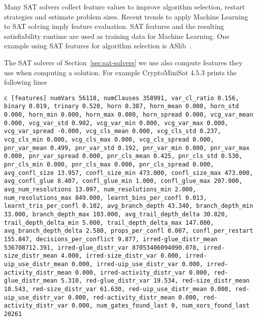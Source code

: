 Many SAT solvers collect feature values to improve algorithm selection,
restart strategies and estimate problem sizes. Recent trends to apply Machine
Learning to SAT solving imply feature evaluation. SAT features and the resulting
satisfiability runtime are used as training data for Machine Learning. One example
using SAT features for algorithm selection is ASlib~\cite{aslib}.

The SAT solvers of Section~\ref{sec:sat-solvers} we use also compute features they use
when computing a solution. For example CryptoMiniSat 4.5.3 prints the following lines

\begin{verbatim}
c [features] numVars 56118, numClauses 358991, var_cl_ratio 0.156, binary 0.019, trinary 0.520, horn 0.387, horn_mean 0.000, horn_std 0.000, horn_min 0.000, horn_max 0.000, horn_spread 0.000, vcg_var_mean 0.000, vcg_var_std 0.902, vcg_var_min 0.000, vcg_var_max 0.000, vcg_var_spread -0.000, vcg_cls_mean 0.000, vcg_cls_std 0.237, vcg_cls_min 0.000, vcg_cls_max 0.000, vcg_cls_spread 0.000, pnr_var_mean 0.499, pnr_var_std 0.192, pnr_var_min 0.000, pnr_var_max 0.000, pnr_var_spread 0.000, pnr_cls_mean 0.425, pnr_cls_std 0.530, pnr_cls_min 0.000, pnr_cls_max 0.000, pnr_cls_spread 0.000, avg_confl_size 13.957, confl_size_min 473.000, confl_size_max 473.000, avg_confl_glue 8.407, confl_glue_min 1.000, confl_glue_max 207.000, avg_num_resolutions 13.097, num_resolutions_min 2.000, num_resolutions_max 849.000, learnt_bins_per_confl 0.013, learnt_tris_per_confl 0.102, avg_branch_depth 43.340, branch_depth_min 33.000, branch_depth_max 103.000, avg_trail_depth_delta 30.820, trail_depth_delta_min 5.000, trail_depth_delta_max 147.000, avg_branch_depth_delta 2.580, props_per_confl 0.007, confl_per_restart 155.847, decisions_per_conflict 9.877, irred-glue_distr_mean 536708712.391, irred-glue_distr_var 87053406094090.078, irred-size_distr_mean 4.000, irred-size_distr_var 0.000, irred-uip_use_distr_mean 0.000, irred-uip_use_distr_var 0.000, irred-activity_distr_mean 0.000, irred-activity_distr_var 0.000, red-glue_distr_mean 5.310, red-glue_distr_var 19.534, red-size_distr_mean 10.543, red-size_distr_var 61.630, red-uip_use_distr_mean 0.000, red-uip_use_distr_var 0.000, red-activity_distr_mean 0.000, red-activity_distr_var 0.000, num_gates_found_last 0, num_xors_found_last 20261
\end{verbatim}

